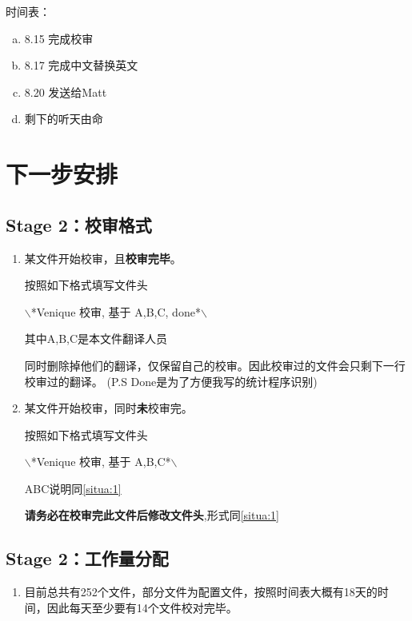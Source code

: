 \documentclass[10pt,a4paper,UTF8]{article}
\begin{document}
    	时间表：

    	\begin{enumerate}[(a)]
    		\item 8.15 完成校审
    		\item 8.17 完成中文替换英文
    		\item 8.20 发送给Matt
    		\item 剩下的听天由命
    	\end{enumerate}


   	\section{下一步安排}
    	\subsection{Stage 2：校审格式}
    		\begin{enumerate}[情况1.]
    			\item \label{situa:1}某文件开始校审，且\textbf{校审完毕}。

    				按照如下格式填写文件头

    				\begin{center}
    					$\backslash$*Venique 校审, 基于 A,B,C, done*$\backslash$
    				\end{center}

    				其中A,B,C是本文件翻译人员

    				同时删除掉他们的翻译，仅保留自己的校审。因此校审过的文件会只剩下一行校审过的翻译。
    				(P.S Done是为了方便我写的统计程序识别)

    			\item 某文件开始校审，同时\textbf{未}校审完。

    				按照如下格式填写文件头

    				\begin{center}
    					$\backslash$*Venique 校审, 基于 A,B,C*$\backslash$
    				\end{center}

    				ABC说明同\ref{situa:1}


    				\textbf{请务必在校审完此文件后修改文件头},形式同\ref{situa:1}

    		\end{enumerate}

    	\subsection{Stage 2：工作量分配}
    		\begin{enumerate}
    			\item 目前总共有252个文件，部分文件为配置文件，按照时间表大概有18天的时间，因此每天至少要有14个文件校对完毕。
    		\end{enumerate}
\end{document}
